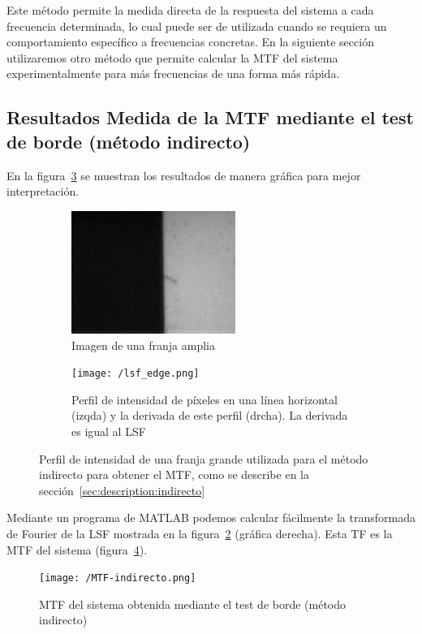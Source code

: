 \documentclass{./packages/optica-article}
\begin{document}
Este método permite la medida directa de la respuesta del sistema a cada frecuencia determinada, lo cual puede ser de utilizada cuando se requiera un comportamiento específico a frecuencias concretas. En la siguiente sección utilizaremos otro método que permite calcular la MTF del sistema experimentalmente para más frecuencias de una forma más rápida.





\subsection{Resultados Medida de la MTF mediante el test de borde (método indirecto)}\label{sec:resultados:indirecto}


En la figura~\ref{fig:perfil} se muestran los resultados de manera gráfica para mejor interpretación.
\begin{figure}[hptb]
	\centering
	\begin{subfigure}[t]{0.35\textwidth}
		\centering
		\includegraphics[height=4cm]{edge_large_line}
		\caption{Imagen de una franja amplia}\label{fig:perfil:img}
	\end{subfigure}
	\quad
	\begin{subfigure}[t]{0.60\textwidth}
		\centering
		\texttt{[image: /lsf\_edge.png]}
		\caption{Perfil de intensidad de píxeles en una línea horizontal (izqda) y la derivada de este perfil (drcha). La derivada es igual al LSF}\label{fig:perfil:graph}
	\end{subfigure}
	\caption{Perfil de intensidad de una franja grande utilizada para el método indirecto para obtener el MTF, como se describe en la sección~\ref{sec:description:indirecto}}\label{fig:perfil}
\end{figure}

Mediante un programa de MATLAB podemos calcular fácilmente la transformada de Fourier de la LSF mostrada en la figura~\ref{fig:perfil:graph} (gráfica derecha). Esta TF es la MTF del sistema (figura~\ref{fig:mtf-indirecto}).

\begin{figure}
    \centering
    \texttt{[image: /MTF-indirecto.png]}
    \caption{MTF del sistema obtenida mediante el test de borde (método indirecto)}
    \label{fig:mtf-indirecto}
\end{figure}
\end{document}
